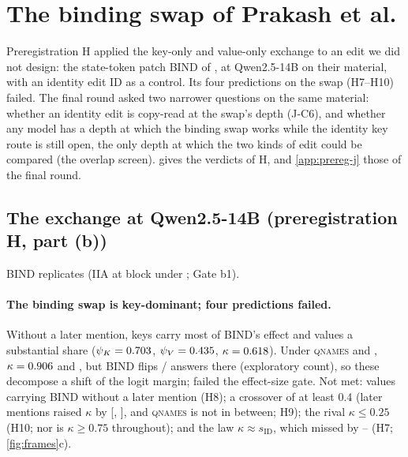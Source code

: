 \section{The binding swap of Prakash et al.}\label{app:binding}\label{sec:prakash}

Preregistration H applied the key-only and value-only exchange to an edit we did not design: the state-token patch BIND of \citet{prakash2025lookbacks}, at Qwen2.5-14B on their material, with an identity edit ID as a control. Its four predictions on the swap (H7--H10) failed. The final round asked two narrower questions on the same material: whether an identity edit is copy-read at the swap's depth (J-C6), and whether any model has a depth at which the binding swap works while the identity key route is still open, the only depth at which the two kinds of edit could be compared (the overlap screen).  gives the verdicts of H, and \cref{app:prereg-j} those of the final round.

\subsection{The exchange at Qwen2.5-14B (preregistration H, part (b))}\label{app:prakash}

BIND replicates (IIA \PkGatebOneBind{} at block \PkLstar{} under \fmtNone{}; Gate b1).

\paragraph{The binding swap is key-dominant; four predictions failed.}
Without a later mention, keys carry most of BIND's effect and values a substantial share ($\psi_K = 0.703{}$, $\psi_V = 0.435{}$, $\kappa = 0.618{}$). Under \textsc{qnames} and \fmtOpt{}, $\kappa = 0.906{}$ and \PkKappaBindOpt{}, but BIND flips \PkNflipBindQnames{}/\PkN{} answers there (exploratory count), so these decompose a shift of the logit margin; \fmtLetter{} failed the effect-size gate. Not met: values carrying BIND without a later mention (H8); a crossover of at least 0.4 (later mentions raised $\kappa$ by \HnineDiff{} [\HnineDiffLo{}, \HnineDiffHi{}], and \textsc{qnames} is not in between; H9); the rival $\kappa \leq 0.25$ (H10; nor is $\kappa \geq 0.75$ throughout); and the law $\kappa \approx s_{\mathrm{ID}}$, which missed by \HsevenGapMin{}--\HsevenGapMax{} (H7; \cref{fig:frames}c).

